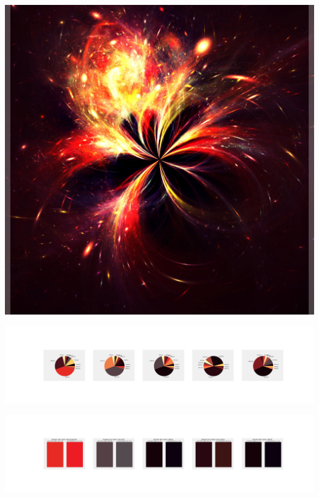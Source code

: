 \documentclass[11pt]{article}
\begin{document}
\begin{landscape}
    \begin{center}
    \includegraphics[width=\textwidth]{./nbimg/file (139).jpg}
    \end{center}

    \begin{center}
    \includegraphics[width=250mm]{./nbimg/pie-44.jpg}
    \end{center}

    \begin{center}
    \includegraphics[width=250mm]{./nbimg/peak-44.jpg}
    \end{center}
    


\end{landscape}
\end{document}
